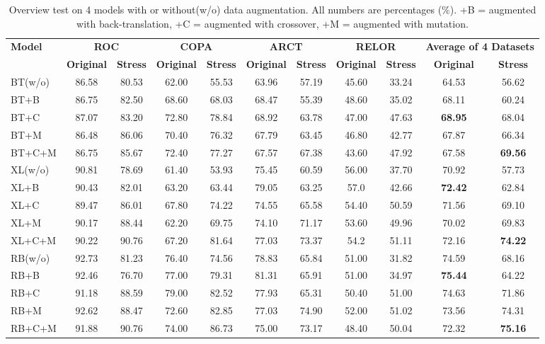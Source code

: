 \begin{table}[th]
	\scriptsize
	\centering
		\begin{tabular}{l|cc|cc|cc|cc|cc}\toprule
			\multirow{2}{*}{\textbf{Model}} & \multicolumn{2}{c|}{\bf ROC} & \multicolumn{2}{c|}{\bf COPA} & \multicolumn{2}{c|}{\bf ARCT} & \multicolumn{2}{c|}{\bf RELOR}& \multicolumn{2}{c}{\bf Average of 4 Datasets} \\ \cline{2-11}
			& \textbf{Original} &\textbf{Stress}&\textbf{Original} &\textbf{Stress}&\textbf{Original} &\textbf{Stress}&\textbf{Original} &\textbf{Stress} & \textbf{Original} &\textbf{Stress} \\ \hline
			BT(w/o)&86.58&80.53&62.00&55.53&63.96&57.19&45.60&33.24 &64.53 &56.62\\
			BT+B&86.75&82.50&68.60&68.03&68.47&55.39&48.60&35.02&68.11&60.24\\
			BT+C&87.07&83.20&72.80&78.84&68.92&63.78&47.00&47.63&\textbf{68.95}&68.04\\
			BT+M&86.48&86.06&70.40&76.32&67.79&63.45&46.80&42.77&67.87&66.34\\
			BT+C+M&86.75&85.67&72.40&77.27&67.57&67.38&43.60&47.92&67.58&\textbf{69.56}\\
			\midrule
			
			XL(w/o)&90.81&78.69&61.40&53.93&75.45&60.59&56.00&37.70&70.92&57.73\\
			XL+B&90.43&82.01&63.20&63.44&79.05&63.25&57.0&42.66&\textbf{72.42}&62.84\\
			XL+C&89.47&86.01&67.80&74.22&74.55&65.58&54.40&50.59&71.56&69.10\\
			XL+M&90.17&88.44&62.20&69.75&74.10&71.17&53.60&49.96&70.02&69.83\\
			XL+C+M&90.22&90.76&67.20&81.64&77.03&73.37&54.2&51.11&72.16&\textbf{74.22}\\
			\midrule
			RB(w/o)&92.73&81.23&76.40&74.56&78.83&65.84&51.00&31.82&74.59&68.16\\
			RB+B&92.46&76.70&77.00&79.31&81.31&65.91&51.00&34.97&\textbf{75.44}&64.22\\
			RB+C&91.18&88.59&79.00&82.52&77.93&65.31&50.40&51.00&74.63&71.86\\
			RB+M&92.62&88.47&72.60&82.85&77.03&74.90&52.00&51.02&73.56&74.31\\
			RB+C+M&91.88&90.76&74.00&86.73&75.00&73.17&48.40&50.04&72.32&\textbf{75.16}\\
			\bottomrule
		\end{tabular}
	\caption{\label{tab:results} Overview test
		on 4 models with or without(w/o) data augmentation.
		All numbers are percentages (\%). 
		+B = augmented with back-translation,
		+C = augmented with crossover, +M = augmented with mutation.}
\end{table}


